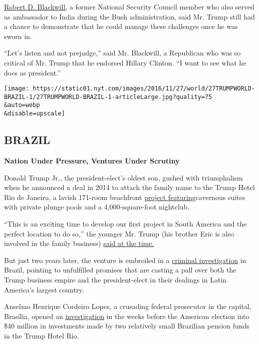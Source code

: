 \href{http://belfercenter.ksg.harvard.edu/experts/4/robert_d_blackwill.html}{Robert
D. Blackwill,} a former National Security Council member who also served
as ambassador to India during the Bush administration, said Mr. Trump
still had a chance to demonstrate that he could manage these challenges
once he was sworn in.

``Let's listen and not prejudge,'' said Mr. Blackwill, a Republican who
was so critical of Mr. Trump that he endorsed Hillary Clinton. ``I want
to see what he does as president.''

\texttt{[image: https://static01.nyt.com/images/2016/11/27/world/27TRUMPWORLD-BRAZIL-1/27TRUMPWORLD-BRAZIL-1-articleLarge.jpg?quality=75\\\&auto=webp\\\&disable=upscale]}

\hypertarget{brazil}{%
\subsection{BRAZIL}\label{brazil}}

\textbf{Nation Under Pressure, Ventures Under Scrutiny}

Donald Trump Jr., the president-elect's oldest son, gushed with
triumphalism when he announced a deal in 2014 to attach the family name
to the Trump Hotel Rio de Janeiro, a lavish 171-room beachfront
\href{https://www.facebook.com/DonaldJTrumpJr/photos/a.319839844707450.84238.295644160460352/744544555570308/?type=1\&theater}{project
featuring}cavernous suites with private plunge pools and a
4,000-square-foot nightclub.

``This is an exciting time to develop our first project in South America
and the perfect location to do so,'' the younger Mr. Trump (his brother
Eric is also involved in the family business)
\href{http://www.prnewswire.com/news-releases/trump-hotel-collection-announces-trump-hotel-rio-de-janeiro-242363971.html}{said
at the time.}

But just two years later, the venture is embroiled in a
\href{http://www.mpf.mp.br/df/sala-de-imprensa/docs/despacho-trump.pdf}{criminal
investigation} in Brazil, pointing to unfulfilled promises that are
casting a pall over both the Trump business empire and the
president-elect in their dealings in Latin America's largest country.

Anselmo Henrique Cordeiro Lopes, a crusading federal prosecutor in the
capital, Brasília, opened an
\href{http://www.mpf.mp.br/df/sala-de-imprensa/docs/despacho-trump.pdf}{investigation}
in the weeks before the American election into \$40 million in
investments made by two relatively small Brazilian pension funds in the
Trump Hotel Rio.

